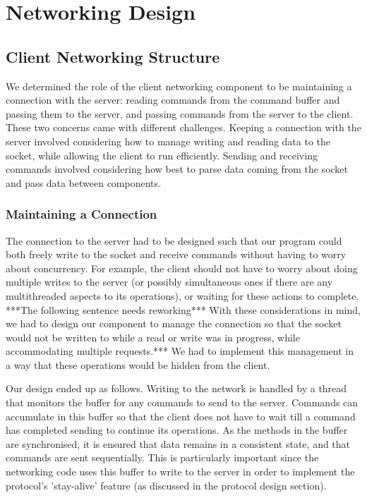\section{Networking Design}

\subsection{Client Networking Structure}

We determined the role of the client networking component to be maintaining a connection with the server: reading commands from the command buffer and passing them to the server, and passing commands from the server to the client. These two concerns came with different challenges. Keeping a connection with the server involved considering how to manage writing and reading data to the socket, while allowing the client to run efficiently. Sending and receiving commands involved considering how best to parse data coming from the socket and pass data between components.

\subsubsection {Maintaining a Connection}

The connection to the server had to be designed such that our program could both freely write to the socket and receive commands without having to worry about concurrency. For example, the client should not have to worry about doing multiple writes to the server (or possibly simultaneous ones if there are any multithreaded aspects to its operations), or waiting for these actions to complete. ***The following sentence needs reworking*** With these considerations in mind, we had to design our component to manage the connection so that the socket would not be written to while a read or write was in progress, while accommodating multiple requests.*** We had to implement this management in a way that these operations would be hidden from the client.

Our design ended up as follows. Writing to the network is handled by a thread that monitors the buffer for any commands to send to the server. Commands can accumulate in this buffer so that the client does not have to wait till a command has completed sending to continue its operations. As the methods in the buffer are synchronised, it is ensured that data remains in a consistent state, and that commands are sent sequentially. This is particularly important since the networking code uses this buffer to write to the server in order to implement the protocol's 'stay-alive' feature (as discussed in the protocol design section).

